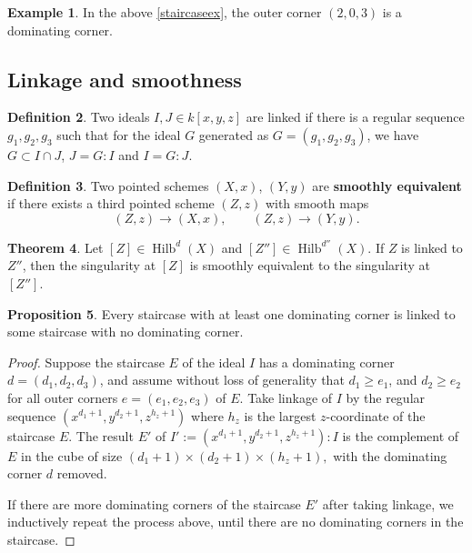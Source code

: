 \documentclass{amsart}[10pt]
\newcommand{\Ytodo}[1]{\todo[color=teal!40,bordercolor=teal,size=\footnotesize]{\textbf{Todo: }#1}}
\theoremstyle{plain}
\theoremstyle{definition}
\newtheorem{theorem}{Theorem}[section]
\newtheorem{proposition}[theorem]{Proposition}
\newtheorem{example}[theorem]{Example}
\newtheorem{definition}[theorem]{Definition}
\begin{document}
\begin{example}
In the above \ref{staircaseex}, the outer corner $(2,0,3)$ is a dominating corner. 
\end{example}

\subsection{Linkage and smoothness}
\begin{definition}
Two ideals $I,J \in k[x,y,z]$ are linked if there is a regular sequence $g_1, g_2, g_3$ such that for the ideal $G$ generated as $G=(g_1, g_2, g_3)$, we have $G \subset I \cap J$, $J=G : I$ and $I=G : J$. 
\end{definition}


\begin{definition}
\cite[Definition 5.5]{AJR1}
Two pointed schemes $(X,x)$, $(Y,y)$ are \textbf{smoothly equivalent} if there exists a third pointed scheme $(Z,z)$ with smooth maps
\[
(Z,z)\to (X,x), \qquad (Z,z)\to (Y,y).
\]
\end{definition}

\begin{theorem}
\label{AJR_singularity_type}
\cite[Theorem 5.6] {AJR1}
Let $[Z]\in \operatorname{Hilb}^d(X)$ and
$[Z'']\in \operatorname{Hilb}^{d''}(X)$.
If $Z$ is linked to $Z''$, then the singularity at $[Z]$ is smoothly equivalent to the singularity at $[Z'']$.
\end{theorem}

\begin{proposition}
Every staircase with at least one dominating corner is linked to some staircase with no dominating corner. 
\end{proposition}

\begin{proof}
Suppose the staircase $E$ of the ideal $I$ has a dominating corner $d=(d_1,d_2,d_3)$, and assume without loss of generality that $d_1 \geq e_1$, and $d_2 \geq e_2$ for all outer corners $e=(e_1,e_2,e_3)$ of $E$. Take linkage of $I$ by the regular sequence $(x^{d_1+1}, y^{d_2+1},z^{h_z+1})$ where $h_z$ is the largest $z$-coordinate of the staircase $E$. The result $E'$ of $I':=(x^{d_1+1}, y^{d_2+1},z^{h_z+1}):I$ is the complement of $E$ in the cube of size $(d_1+1)\times(d_2+1)\times(h_z+1),$ with the dominating corner $d$ removed.

If there are more dominating corners of the staircase $E'$ after taking linkage, we inductively repeat the process above, until there are no dominating corners in the staircase.
\end{proof}
\end{document}
